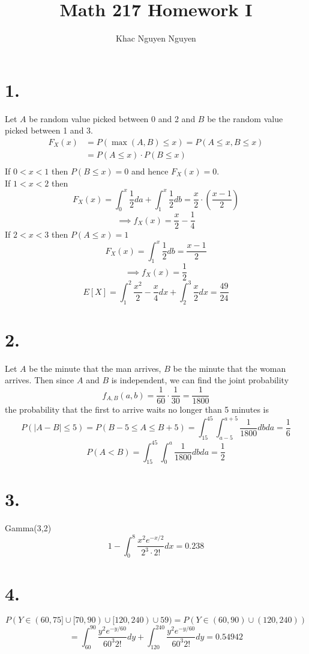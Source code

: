 \documentclass[11pt]{article}
\title{\textbf{Math 217 Homework I}}
\author{Khac Nguyen Nguyen}
\date{}
\begin{document}
\section*{1.}
Let $A$ be random value picked between 0 and 2 and $B$ be the random value picked between 1 and 3. 
\begin{equation*}
    \begin{aligned}
        F_X(x) &= P(\max(A,B) \le x) = P(A\le x, B\le x) \\
        &= P(A\le x) \cdot P(B\le x) \\
    \end{aligned}
\end{equation*}
If $0<x<1$ then $P(B \le x) = 0$ and hence $F_X(x) = 0$. \\
If $1<x<2$ then 
\[
    F_X(x) = \int_0^x \frac{1}{2} da + \int_1^x \frac{1}{2} db = \frac{x}{2}\cdot \left(\frac{x-1}{2}\right)
\]
\[
    \implies f_X(x) = \frac{x}{2}-\frac{1}{4}    
\]
If $2<x<3$ then $P(A\le x) = 1$
\[
    F_X(x) = \int_1^x \frac{1}{2} db = \frac{x-1}{2}
\]
\[
    \implies f_X(x) = \frac{1}{2}
\]
\[
    E[X] = \int_1^2 \frac{x^2}{2}-\frac{x}{4} dx + \int_2^3 \frac{x}{2} dx = \frac{49}{24}
\]
\pagebreak
\section*{2.}
Let $A$ be the minute that the man arrives, $B$ be the minute that the woman arrives. Then since $A$ and $B$ is independent, we can find the joint probability
\[
    f_{A,B}(a,b) = \frac{1}{60} \cdot \frac{1}{30} = \frac{1}{1800}    
\] the probability that 
the first to arrive waits no longer than 5 minutes is 
\[
    P(|A-B|\le 5) = P(B-5\le A \le B+5) = \int_{15}^{45} \int_{a-5}^{a+5} \frac{1}{1800} dbda = \frac{1}{6}
\]
\[
    P(A<B) = \int_{15}^{45} \int_0^a \frac{1}{1800} dbda = \frac{1}{2}
\]
\pagebreak
\section*{3.}
Gamma(3,2)
\[
    1-\int_0^8  \frac{x^2e^{-x/2}}{2^3 \cdot 2!} dx = 0.238 
\]
\pagebreak
\section*{4.}
\[
    P(Y \in (60,75] \cup [70,90) \cup [120,240) \cup {59}) = P(Y \in (60,90) \cup (120,240))
\]
\[
    = \int_{60}^{90} \frac{y^2e^{-y/60}}{60^3 2!} dy + \int_{120}^{240} \frac{y^2e^{-y/60}}{60^3 2!} dy = 0.54942
\]
\end{document}
